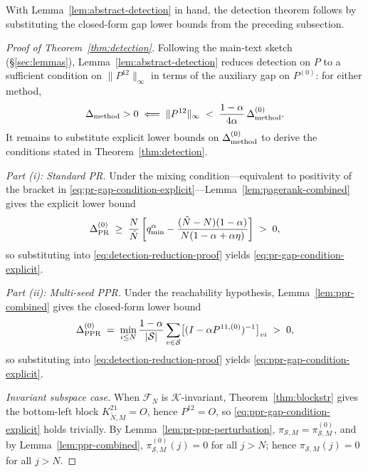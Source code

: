 \documentclass{article}
\theoremstyle{plain}
\theoremstyle{definition}
\def\Koop{\mathcal{K}}
\def\Fc{\mathcal{F}}
\begin{document}
With Lemma~\ref{lem:abstract-detection} in hand, the detection theorem follows by substituting the closed-form gap lower bounds from the preceding subsection.

\begin{proof}[Proof of Theorem~\ref{thm:detection}]
	Following the main-text sketch (\S\ref{sec:lemmas}), Lemma~\ref{lem:abstract-detection} reduces detection on $P$ to a sufficient condition on $\|P^{12}\|_\infty$ in terms of the auxiliary gap on $P^{(0)}$: for either method,
		\begin{equation}\label{eq:detection-reduction-proof}
			\Delta_{\textnormal{method}} > 0 \;\Longleftarrow\; \|P^{12}\|_\infty \;<\; \frac{1-\alpha}{4\alpha}\,\Delta^{(0)}_{\textnormal{method}}.
		\end{equation}
		It remains to substitute explicit lower bounds on $\Delta^{(0)}_{\textnormal{method}}$ to derive the conditions stated in Theorem~\ref{thm:detection}.
	
	\emph{Part (i): Standard PR.} Under the mixing condition---equivalent to positivity of the bracket in \eqref{eq:pr-gap-condition-explicit}---Lemma~\ref{lem:pagerank-combined} gives the explicit lower bound
		\begin{equation*}
			\Delta^{(0)}_{\textnormal{PR}} \;\geq\; \frac{N}{\tilde{N}}\left[q_{\min}^\alpha - \frac{(\tilde{N}-N)(1-\alpha)}{N(1-\alpha+\alpha\eta)}\right] \;>\; 0,
		\end{equation*}
		so substituting into \eqref{eq:detection-reduction-proof} yields \eqref{eq:pr-gap-condition-explicit}.
	
	\emph{Part (ii): Multi-seed PPR.} Under the reachability hypothesis, Lemma~\ref{lem:ppr-combined} gives the closed-form lower bound
		\begin{equation*}
			\Delta^{(0)}_{\textnormal{PPR}} \;=\; \min_{i\leq N}\frac{1-\alpha}{|\mathcal{S}|}\sum_{v\in\mathcal{S}}\bigl[(I - \alpha P^{11,(0)})^{-1}\bigr]_{vi} \;>\; 0,
		\end{equation*}
		so substituting into \eqref{eq:detection-reduction-proof} yields \eqref{eq:ppr-gap-condition-explicit}.
	
	\emph{Invariant subspace case.} When $\Fc_N$ is $\Koop$-invariant, Theorem~\ref{thm:blockstr} gives the bottom-left block $K_{\tilde{N},M}^{21} = O$, hence $P^{12} = O$, so \eqref{eq:ppr-gap-condition-explicit} holds trivially. By Lemma~\ref{lem:pr-ppr-perturbation}, ${\pi}_{\mathcal{S}, M} = {\pi}_{\mathcal{S}, M}^{(0)}$, and by Lemma~\ref{lem:ppr-combined}, $\pi_{\mathcal{S}, M}^{(0)}(j) = 0$ for all $j > N$; hence $\pi_{\mathcal{S}, M}(j) = 0$ for all $j > N$. \qedhere
\end{proof}
\end{document}
